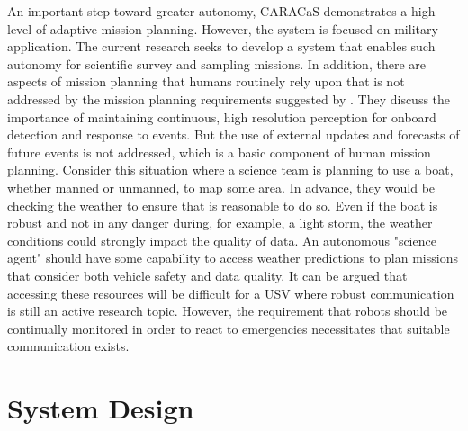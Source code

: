 \documentclass{tamuccthesis}
\begin{document}
An important step toward greater autonomy, CARACaS demonstrates a high level of adaptive mission planning. However, the system is focused on military application. The current research seeks to develop a system that enables such autonomy for scientific survey and sampling missions. In addition, there are aspects of mission planning that humans routinely rely upon that is not addressed by the mission planning requirements suggested by \cite{heo2017case}. They discuss the importance of maintaining continuous, high resolution perception for onboard detection and response to events. But the use of external updates and forecasts of future events is not addressed, which is a basic component of human mission planning. Consider this situation where a science team is planning to use a boat, whether manned or unmanned, to map some area. In advance, they would be checking the weather to ensure that is reasonable to do so. Even if the boat is robust and not in any danger during, for example, a light storm, the weather conditions could strongly impact the quality of data. An autonomous "science agent" should have some capability to access weather predictions to plan missions that consider both vehicle safety and data quality. It can be argued that accessing these resources will be difficult for a USV where robust communication is still an active research topic. However, the requirement that robots should be continually monitored in order to react to emergencies necessitates that suitable communication exists. 

\chapter{System Design}
\end{document}
